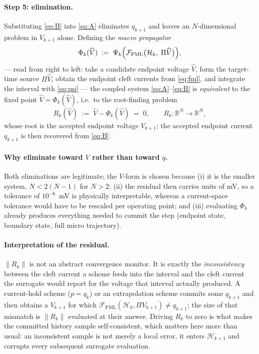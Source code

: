 \documentclass[11pt]{article}
\newcommand{\FML}{\mathcal{F}_{\mathrm{FML}}}
\newcommand{\Rn}{\mathbb{R}}
\begin{document}
\paragraph{Step 5: elimination.}
Substituting \eqref{eq:B} into \eqref{eq:A} eliminates $q_{k+1}$ and leaves an
$N$-dimensional problem in $V_{k+1}$ alone. Defining the \emph{macro propagator}
\begin{equation}
\Phi_k(\widehat V)\;:=\;\Psi_k\Bigl(\FML\bigl(\mathcal H_k,\;\Pi\widehat V\bigr)\Bigr),
\label{eq:Phi}
\end{equation}
--- read from right to left: take a candidate endpoint voltage $\widehat V$,
form the target-time source $\Pi\widehat V$, obtain the endpoint cleft currents
from \eqref{eq:fml}, and integrate the interval with \eqref{eq:psi} --- the
coupled system \eqref{eq:A}--\eqref{eq:B} is \emph{equivalent} to the fixed
point $\widehat V=\Phi_k(\widehat V)$, i.e.\ to the root-finding problem
\begin{equation}
\boxed{\;
R_k(\widehat V)\;:=\;\widehat V-\Phi_k(\widehat V)\;=\;0,
\qquad R_k:\Rn^N\to\Rn^N,
\;}
\label{eq:residual}
\end{equation}
whose root is the accepted endpoint voltage $V_{k+1}$; the accepted endpoint
current $q_{k+1}$ is then recovered from \eqref{eq:B}.

\paragraph{Why eliminate toward $V$ rather than toward $q$.}
Both eliminations are legitimate; the $V$-form is chosen because (i) it is the
smaller system, $N<2(N-1)$ for $N>2$; (ii) the residual then carries units of mV,
so a tolerance of $10^{-6}$~mV is physically interpretable, whereas a
current-space tolerance would have to be rescaled per operating point; and (iii)
evaluating $\Phi_k$ already produces everything needed to commit the step
(endpoint state, boundary state, full micro trajectory).

\paragraph{Interpretation of the residual.}
$\|R_k\|$ is not an abstract convergence monitor. It is exactly the
\emph{inconsistency} between the cleft current a scheme feeds into the interval
and the cleft current the surrogate would report for the voltage that interval
actually produced. A current-hold scheme ($p=q_k$) or an extrapolation scheme
commits some $q_{k+1}$ and then obtains a $V_{k+1}$ for which
$\FML(\mathcal H_k,\Pi V_{k+1})\ne q_{k+1}$; the size of that mismatch is
$\|R_k\|$ evaluated
at their answer. Driving $R_k$ to zero is what makes the committed history
sample self-consistent, which matters here more than usual: an inconsistent
sample is not merely a local error, it enters $\mathcal H_{k+1}$ and corrupts
every subsequent surrogate evaluation.
\end{document}
